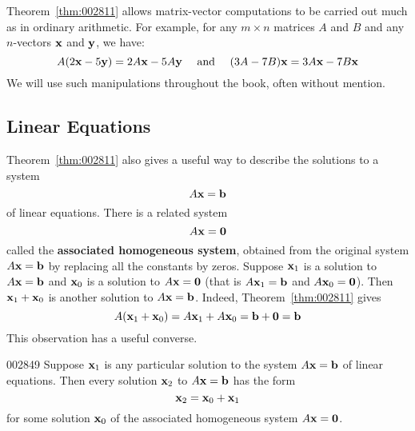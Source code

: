 \noindent Theorem~\ref{thm:002811} allows matrix-vector computations to be carried out much as in ordinary arithmetic. For example, for any $m \times n$ matrices $A$ and $B$ and any $n$-vectors $\textbf{x}$ and $\textbf{y}$, we have:
\begin{equation*}
A(2\textbf{x} - 5\textbf{y}) = 2A\textbf{x} - 5A\textbf{y} \quad \mbox{ and } \quad (3A -7B)\textbf{x} = 3A\textbf{x} - 7B\textbf{x}
\end{equation*}
We will use such manipulations throughout the book, often without mention.

\subsection*{Linear Equations}

Theorem~\ref{thm:002811} also gives a useful way to describe the solutions to a system
\begin{equation*}
A\textbf{x} = \textbf{b}
\end{equation*}
of linear equations. There is a related system
\begin{equation*}
A\textbf{x} = \textbf{0}
\end{equation*}
called the \textbf{associated homogeneous system}, obtained from the original system $A\textbf{x} = \textbf{b}$ by replacing all the constants by zeros. Suppose $\textbf{x}_{1}$ is a solution to $A\textbf{x} = \textbf{b}$ and $\textbf{x}_{0}$ is a solution to $A\textbf{x} = \textbf{0}$ (that is $A\textbf{x}_{1} = \textbf{b}$ and $A\textbf{x}_{0} = \textbf{0}$). Then $\textbf{x}_{1} + \textbf{x}_{0}$ is another solution to $A\textbf{x} = \textbf{b}$. Indeed, Theorem~\ref{thm:002811} gives
\begin{equation*}
A(\textbf{x}_{1} + \textbf{x}_{0}) = A\textbf{x}_{1} + A\textbf{x}_{0} = \textbf{b} + \textbf{0} = \textbf{b}
\end{equation*}
This observation has a useful converse.


\begin{theorem}{}{002849}
Suppose $\textbf{x}_{1}$ is any particular solution to the system $A\textbf{x} = \textbf{b}$ of linear equations. Then every solution $\textbf{x}_{2}$ to $A\textbf{x} = \textbf{b}$ has the form
\begin{equation*}
\textbf{x}_{2} = \textbf{x}_{0} + \textbf{x}_{1}
\end{equation*}
for some solution $\textbf{x}_{0}$ of the associated homogeneous system $A\textbf{x} = \textbf{0}$.
\end{theorem}

